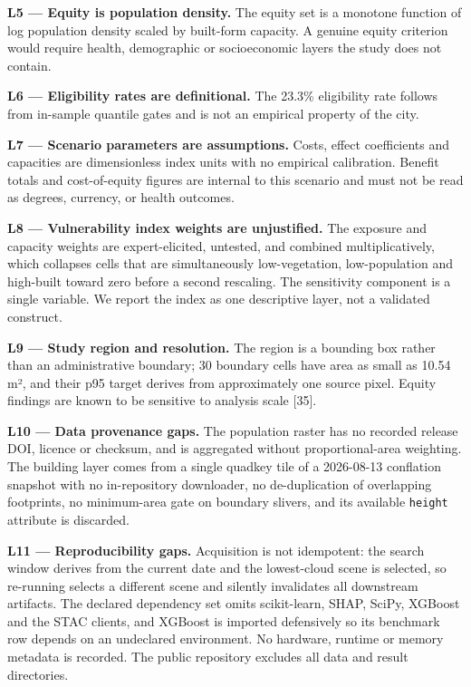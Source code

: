 \textbf{L5 --- Equity is population density.} The equity set is a monotone function of log population
density scaled by built-form capacity. A genuine equity criterion would require health, demographic
or socioeconomic layers the study does not contain.

\textbf{L6 --- Eligibility rates are definitional.} The 23.3\% eligibility rate follows from in-sample
quantile gates and is not an empirical property of the city.

\textbf{L7 --- Scenario parameters are assumptions.} Costs, effect coefficients and capacities are
dimensionless index units with no empirical calibration. Benefit totals and cost-of-equity figures
are internal to this scenario and must not be read as degrees, currency, or health outcomes.

\textbf{L8 --- Vulnerability index weights are unjustified.} The exposure and capacity weights are
expert-elicited, untested, and combined multiplicatively, which collapses cells that are simultaneously
low-vegetation, low-population and high-built toward zero before a second rescaling. The sensitivity
component is a single variable. We report the index as one descriptive layer, not a validated
construct.

\textbf{L9 --- Study region and resolution.} The region is a bounding box rather than an administrative
boundary; 30 boundary cells have area as small as 10.54 m², and their p95 target derives from
approximately one source pixel. Equity findings are known to be sensitive to analysis scale {[}35{]}.

\textbf{L10 --- Data provenance gaps.} The population raster has no recorded release DOI, licence or
checksum, and is aggregated without proportional-area weighting. The building layer comes from a
single quadkey tile of a 2026-08-13 conflation snapshot with no in-repository downloader, no
de-duplication of overlapping footprints, no minimum-area gate on boundary slivers, and its available
\texttt{height} attribute is discarded.

\textbf{L11 --- Reproducibility gaps.} Acquisition is not idempotent: the search window derives from the
current date and the lowest-cloud scene is selected, so re-running selects a different scene and
silently invalidates all downstream artifacts. The declared dependency set omits scikit-learn, SHAP,
SciPy, XGBoost and the STAC clients, and XGBoost is imported defensively so its benchmark row depends
on an undeclared environment. No hardware, runtime or memory metadata is recorded. The public
repository excludes all data and result directories.

